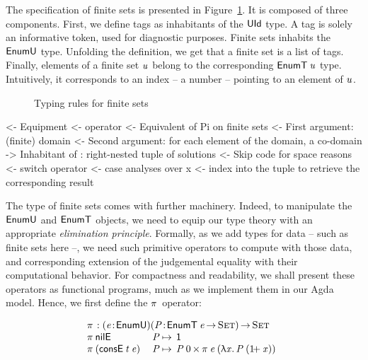 The specification of finite sets is presented in
Figure~\ref{fig:typing-finite-set}. It is composed of three
components. First, we define tags as inhabitants of the $\UId$ type. A
tag is solely an informative token, used for diagnostic
purposes. Finite sets inhabits the $\EnumU$ type. Unfolding the
definition, we get that a finite set is a list of tags. Finally,
elements of a finite set $\V{u}$ belong to the corresponding $\EnumT{\V{u}}$
type. Intuitively, it corresponds to an index -- a number -- pointing
to an element of $\V{u}$.

\begin{figure}



\caption{Typing rules for finite sets}
\label{fig:typing-finite-set}

\end{figure}


\begin{wstructure}
<- Equipment
    <- \spi operator
        <- Equivalent of Pi on finite sets
        <- First argument: (finite) domain
        <- Second argument: for each element of the domain, a co-domain
        -> Inhabitant of \spi: right-nested tuple of solutions
            <- Skip code for space reasons
    <- switch operator
        <- case analyses over x
        <- index into the \spi tuple to retrieve the corresponding result
\end{wstructure}

The type of finite sets comes with further machinery. Indeed, to
manipulate the $\EnumU$ and $\EnumT{\!}$ objects, we need to equip our
type theory with an appropriate \emph{elimination
  principle}. Formally, as we add types for data -- such as finite
sets here --, we need such primitive operators to compute with those
data, and corresponding extension of the judgemental equality with
their computational behavior. For compactness and readability, we
shall present these operators as functional programs, much as we
implement them in our Agda model. Hence, we first define the
$\spi{\!}{\!}$ operator:

\[\stk{
\spi{\!}{\!} : \PITEL{\V{e}}{\EnumU}
           \PITEL{\V{P}}{\EnumT{\V{e}} \To \Set} \To \Set \\
\begin{array}{@{}ll@{\:\mapsto\:\:}l}
\spi{\NilE}{& \V{P}}        & \Unit \\
\spi{(\ConsE{\V{t}}{\V{e}})}{& \V{P}} & \TIMES{\V{P}\: \Ze}{\spi{\V{e}}{(\LAM{\V{x}} \V{P}\: (\Su{\V{x}}))}}
\end{array}
}\]

